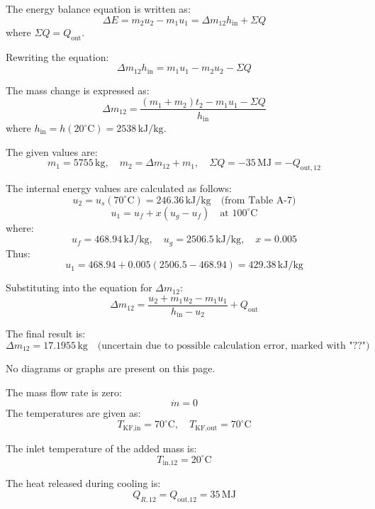 The energy balance equation is written as:  
\[
\Delta E = m_2 u_2 - m_1 u_1 = \Delta m_{12} h_{\text{in}} + \Sigma Q
\]  
where \( \Sigma Q = Q_{\text{out}} \).  

Rewriting the equation:  
\[
\Delta m_{12} h_{\text{in}} = m_1 u_1 - m_2 u_2 - \Sigma Q
\]  

The mass change is expressed as:  
\[
\Delta m_{12} = \frac{(m_1 + m_2) t_2 - m_1 u_1 - \Sigma Q}{h_{\text{in}}}
\]  
where \( h_{\text{in}} = h(20^\circ\text{C}) = 2538 \, \text{kJ/kg} \).  

The given values are:  
\[
m_1 = 5755 \, \text{kg}, \quad m_2 = \Delta m_{12} + m_1, \quad \Sigma Q = -35 \, \text{MJ} = -Q_{\text{out},12}
\]  

The internal energy values are calculated as follows:  
\[
u_2 = u_s(70^\circ\text{C}) = 246.36 \, \text{kJ/kg} \quad \text{(from Table A-7)}
\]  
\[
u_1 = u_f + x(u_g - u_f) \quad \text{at } 100^\circ\text{C}
\]  
where:  
\[
u_f = 468.94 \, \text{kJ/kg}, \quad u_g = 2506.5 \, \text{kJ/kg}, \quad x = 0.005
\]  
Thus:  
\[
u_1 = 468.94 + 0.005(2506.5 - 468.94) = 429.38 \, \text{kJ/kg}
\]  

Substituting into the equation for \( \Delta m_{12} \):  
\[
\Delta m_{12} = \frac{u_2 + m_1 u_2 - m_1 u_1}{h_{\text{in}} - u_2} + Q_{\text{out}}
\]  

The final result is:  
\[
\Delta m_{12} = 17.1955 \, \text{kg} \quad \text{(uncertain due to possible calculation error, marked with "??")}
\]  

No diagrams or graphs are present on this page.

The mass flow rate is zero:  
\[
\dot{m} = 0
\]  
The temperatures are given as:  
\[
T_{\text{KF,in}} = 70^\circ\text{C}, \quad T_{\text{KF,out}} = 70^\circ\text{C}
\]  

The inlet temperature of the added mass is:  
\[
T_{\text{in,12}} = 20^\circ\text{C}
\]  

The heat released during cooling is:  
\[
Q_{R,12} = Q_{\text{out,12}} = 35 \, \text{MJ}
\]